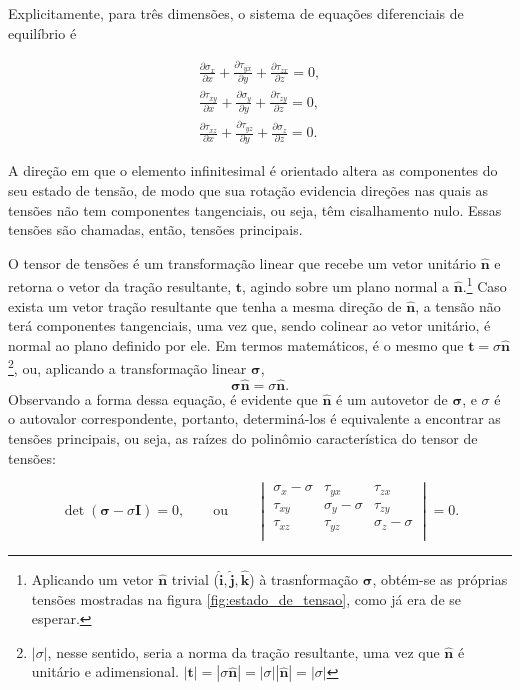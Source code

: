 Explicitamente, para três dimensões, o sistema de equações diferenciais de equilíbrio é

\begin{gather}
       \displaystyle \frac{\partial \sigma_x}{\partial x} + \frac{\partial \tau_{yx}}{\partial y} + \frac{\partial \tau_{zx}}{\partial z} = 0, \\
       \displaystyle \frac{\partial \tau_{xy}}{\partial x} + \frac{\partial \sigma_y}{\partial y} + \frac{\partial \tau_{zy}}{\partial z} = 0, \\
       \displaystyle \frac{\partial \tau_{xz}}{\partial x} + \frac{\partial \tau_{yz}}{\partial y} + \frac{\partial \sigma_z}{\partial z} = 0.
       \label{eq:equilibrio_governo}
\end{gather}


A direção em que o elemento infinitesimal é orientado altera as componentes do seu estado de tensão, de modo que sua rotação evidencia direções nas quais as tensões não tem componentes tangenciais, ou seja, têm cisalhamento nulo. Essas tensões são chamadas, então, tensões principais.

O tensor de tensões é um transformação linear que recebe um vetor unitário $\bm{\hat{n}}$ e retorna o vetor da tração resultante, $\bm{t}$, agindo sobre um plano normal a $\bm{\hat{n}}$.\footnote{Aplicando um vetor $\bm{\hat{n}}$ trivial ($\bm{\hat{i}}, \bm{\hat{j}}, \bm{\hat{k}}$) à trasnformação $\bm{\sigma}$, obtém-se as próprias tensões mostradas na figura \ref{fig:estado_de_tensao}, como já era de se esperar.} Caso exista um vetor tração resultante que tenha a mesma direção de $\bm{\hat{n}}$, a tensão não terá componentes tangenciais, uma vez que, sendo colinear ao vetor unitário, é normal ao plano definido por ele. Em termos matemáticos, é o mesmo que $\bm{t} = \sigma \bm{\hat{n}}$\footnote{$|\sigma|$, nesse sentido, seria a norma da tração resultante, uma vez que $\bm{\hat{n}}$ é unitário e adimensional. $ |\bm{t}| = |\sigma \bm{\hat{n}}| = |\sigma| |\bm{\hat{n}}| = |\sigma| $}, ou, aplicando a transformação linear $\bm{\sigma}$,
\begin{equation}
    \bm{\sigma}\bm{\hat{n}} = \sigma \bm{\hat{n}}.
\end{equation}
Observando a forma dessa equação, é evidente que $\bm{\hat{n}}$ é um autovetor de $\bm{\sigma}$, e $\sigma$ é o autovalor correspondente, portanto, determiná-los é equivalente a encontrar as tensões principais, ou seja, as raízes do polinômio característica do tensor de tensões:

\begin{equation}
    \det{(\bm{\sigma} - \sigma \bm{I})} = 0, \qquad \text{ou} \qquad \begin{vmatrix}
        \sigma_x - \sigma & \tau_{yx} & \tau_{zx} \\
        \tau_{xy} & \sigma_{y} - \sigma & \tau_{zy} \\
        \tau_{xz} & \tau_{yz} & \sigma_{z} - \sigma \\
    \end{vmatrix} = 0.
\end{equation}

